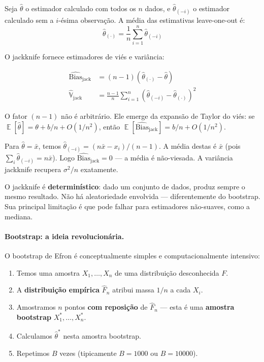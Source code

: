 \documentclass{tufte-handout}
\DeclareMathOperator{\E}{\mathbb{E}}
\DeclareMathOperator{\Var}{\mathbb{V}}
\begin{document}
\begin{defn}
    Seja $\hat{\theta}$ o estimador calculado com todos os $n$ dados, e $\hat{\theta}_{(-i)}$ o estimador calculado sem a $i$-ésima observação. A média das estimativas leave-one-out é:
    \[
    \hat{\theta}_{(\cdot)} = \frac{1}{n} \sum_{i=1}^n \hat{\theta}_{(-i)}
    \]
\end{defn}

O jackknife fornece estimadores de viés e variância:

\begin{align*}
    \widehat{\text{Bias}}_{\text{jack}} &= (n-1)(\hat{\theta}_{(\cdot)} - \hat{\theta}) \\
    \widehat{\Var}_{\text{jack}} &= \frac{n-1}{n} \sum_{i=1}^n (\hat{\theta}_{(-i)} - \hat{\theta}_{(\cdot)})^2
\end{align*}

O fator $(n-1)$ não é arbitrário. Ele emerge da expansão de Taylor do viés: se $\E[\hat{\theta}] = \theta + b/n + O(1/n^2)$, então $\E[\widehat{\text{Bias}}_{\text{jack}}] = b/n + O(1/n^2)$.

\begin{exmp}
    Para $\hat{\theta} = \bar{x}$, temos $\hat{\theta}_{(-i)} = (n\bar{x} - x_i)/(n-1)$. A média destas é $\bar{x}$ (pois $\sum_i \hat{\theta}_{(-i)} = n\bar{x}$). Logo $\widehat{\text{Bias}}_{\text{jack}} = 0$ --- a média é não-viesada. A variância jackknife recupera $\sigma^2/n$ exatamente.
\end{exmp}

\begin{remark}
    O jackknife é \textbf{determinístico}: dado um conjunto de dados, produz sempre o mesmo resultado. Não há aleatoriedade envolvida --- diferentemente do bootstrap. Sua principal limitação é que pode falhar para estimadores não-suaves, como a mediana.
\end{remark}

\paragraph{Bootstrap: a ideia revolucionária.}

O bootstrap de Efron é conceptualmente simples e computacionalmente intensivo:

\begin{enumerate}
    \item Temos uma amostra $X_1, \dots, X_n$ de uma distribuição desconhecida $F$.
    \item A \textbf{distribuição empírica} $\hat{F}_n$ atribui massa $1/n$ a cada $X_i$.
    \item Amostramos $n$ pontos \textbf{com reposição} de $\hat{F}_n$ --- esta é uma \textbf{amostra bootstrap} $X_1^*, \dots, X_n^*$.
    \item Calculamos $\hat{\theta}^*$ nesta amostra bootstrap.
    \item Repetimos $B$ vezes (tipicamente $B = 1000$ ou $B = 10000$).
\end{enumerate}
\end{document}
